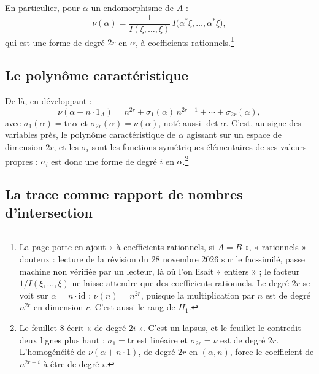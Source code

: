 \documentclass[11pt,a4paper]{article}
\begin{document}
En particulier, pour $\alpha$ un endomorphisme de $A$ :
\[
  \nu(\alpha) = \frac{1}{I(\xi, \ldots, \xi)}\,
  I\bigl(\alpha^{*}\xi, \ldots, \alpha^{*}\xi\bigr),
\]
qui est une forme de degré $2r$ en $\alpha$, à coefficients
rationnels.\footnote{La page porte en ajout « à coefficients rationnels, si
$A = B$ », « rationnels » douteux : lecture de la révision du 28 novembre 2026
sur le fac-similé, passe machine non vérifiée par un lecteur, là où l'on lisait
« entiers » ; le facteur $1/I(\xi, \ldots, \xi)$ ne laisse attendre que des
coefficients rationnels. Le degré $2r$ se voit sur $\alpha = n \cdot \mathrm{id}$ :
$\nu(n) = n^{2r}$, puisque la multiplication par $n$ est de degré $n^{2r}$ en
dimension $r$. C'est aussi le rang de $H_{1}$.}

\subsection*{Le polynôme caractéristique}

De là, en développant :
\[
  \nu(\alpha + n \cdot 1_{A}) = n^{2r} + \sigma_{1}(\alpha)\,n^{2r-1} +
  \cdots + \sigma_{2r}(\alpha),
\]
avec $\sigma_{1}(\alpha) = \mathrm{tr}\,\alpha$ et $\sigma_{2r}(\alpha) =
\nu(\alpha)$, noté aussi $\det \alpha$. C'est, au signe des variables près, le
polynôme caractéristique de $\alpha$ agissant sur un espace de dimension $2r$,
et les $\sigma_{i}$ sont les fonctions symétriques élémentaires de ses valeurs
propres : $\sigma_{i}$ est donc une forme de degré $i$ en
$\alpha$.\footnote{Le feuillet 8 écrit « de degré $2i$ ». C'est un lapsus, et
le feuillet le contredit deux lignes plus haut : $\sigma_{1} = \mathrm{tr}$ est
linéaire et $\sigma_{2r} = \nu$ est de degré $2r$. L'homogénéité de
$\nu(\alpha + n \cdot 1)$, de degré $2r$ en $(\alpha, n)$, force le coefficient
de $n^{2r-i}$ à être de degré $i$.}

\subsection*{La trace comme rapport de nombres d'intersection}
\end{document}

